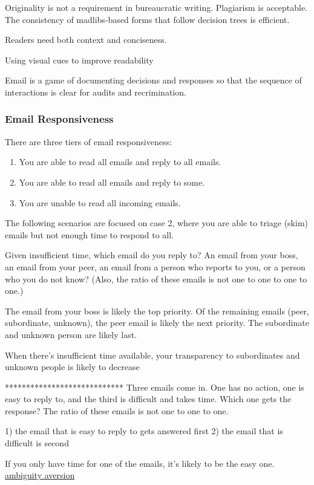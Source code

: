 Originality is not a requirement in bureaucratic writing. Plagiarism is acceptable. The consistency of madlibs-based forms that follow decision trees is efficient. 

Readers need both context and conciseness. 

Using visual cues to improve readability

Email is a game of documenting decisions and responses so that the sequence of interactions is clear for audits and recrimination. 

\subsubsection{Email Responsiveness\label{sec:email-responsiveness}}

There are three tiers of email responsiveness:
\begin{enumerate}
    \item You are able to read all emails and reply to all emails.
    \item You are able to read all emails and reply to some.
    \item You are unable to read all incoming emails. 
\end{enumerate}
The following scenarios are focused on case 2, where you are able to triage (skim) emails but not enough time to respond to all.


Given insufficient time, which email do you reply to? An email from your boss, an email from your peer, an email from a person who reports to you, or a person who you do not know?
(Also, the ratio of these emails is not one to one to one to one.)

The email from your boss is likely the top priority. Of the remaining emails (peer, subordinate, unknown), the peer email is likely the next priority.
The subordinate and unknown person are likely last.

When there's insufficient time available, your transparency to subordinates and unknown people is likely to decrease

****************************
Three emails come in. One has no action, one is easy to reply to, and the third is difficult and takes time. Which one gets the response?
The ratio of these emails is not one to one to one.

1) the email that is easy to reply to gets answered first
2) the email that is difficult is second

If you only have time for one of the emails, it's likely to be the easy one. 
\href{https://en.wikipedia.org/wiki/Ambiguity_aversion}{ambiguity aversion}

